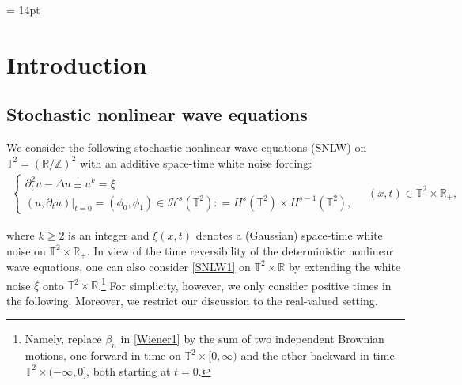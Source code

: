 \documentclass[letterpaper, 11pt,  reqno]{amsart}
\newcommand{\1}{\hspace{0.5mm}\text{I}\hspace{0.5mm}}
\newcommand{\noi}{\noindent}
\newcommand{\Z}{\mathbb{Z}}
\newcommand{\R}{\mathbb{R}}
\newcommand{\T}{\mathbb{T}}
\newcommand{\be}{\beta}
\newcommand{\Dl}{\Delta}
\newcommand{\dt}{\partial_t}
\renewcommand{\H}{\mathcal{H}}
\numberwithin{equation}{section}
\numberwithin{theorem}{section}
\begin{document}
\maketitle
%


\baselineskip = 14pt






\section{Introduction}



\subsection{Stochastic nonlinear wave equations}


We consider 
the following stochastic nonlinear wave equations (SNLW)  on $\T^2 = (\R/\Z)^2$
with an additive space-time white noise forcing:
\begin{align}
\begin{cases}
\dt^2 u -  \Dl  u   \pm  u^k = \xi\\
(u, \dt u) |_{t = 0} = (\phi_0, \phi_1) \in \H^s(\T^2) : = H^s(\T^2)\times H^{s-1}(\T^2), 
\end{cases}
\quad (x, t) \in \T^2\times \R_+,
\label{SNLW1}
\end{align}


\noi
where $k\geq 2$ is an integer and 
$\xi(x, t)$ denotes a (Gaussian) space-time white noise on $\T^2\times \R_+$.
In view of the time reversibility of the deterministic nonlinear wave equations, 
one can also consider \eqref{SNLW1} on $\T^2 \times \R$
by extending 
the white noise $\xi$ onto $\T^2 \times \R$.\footnote{Namely, 
replace
$\be_n$ in \eqref{Wiener1} by the sum of  two independent Brownian motions, one forward in time on $\T^2\times [0, \infty)$ and 
the other backward in time $\T^2 \times (-\infty, 0]$,
both starting at $t = 0$.}
For simplicity, however, we only consider positive times in the following.
Moreover, we restrict our discussion to the real-valued setting.
\end{document}
